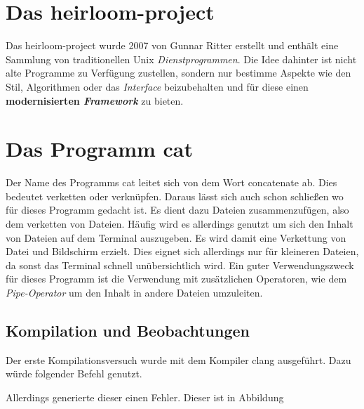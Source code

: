 \section{Das heirloom-project}
Das heirloom-project wurde 2007 von Gunnar Ritter erstellt und enthält eine Sammlung von traditionellen Unix \textit{Dienstprogrammen}. Die Idee dahinter ist nicht alte Programme zu Verfügung zustellen, sondern nur bestimme Aspekte wie den Stil, Algorithmen oder das \textit{Interface} beizubehalten und für diese einen \textbf{modernisierten \textit{Framework}} zu bieten.

\section{Das Programm cat}
Der Name des Programms cat leitet sich von dem Wort concatenate ab. Dies bedeutet verketten oder verknüpfen. Daraus lässt sich auch schon schließen wo für dieses Programm gedacht ist. Es dient dazu Dateien zusammenzufügen, also dem verketten von Dateien. Häufig wird es allerdings genutzt um sich den Inhalt von Dateien auf dem Terminal auszugeben. Es wird damit eine Verkettung von Datei und Bildschirm erzielt. Dies eignet sich allerdings nur für kleineren Dateien, da sonst das Terminal schnell unübersichtlich wird. Ein guter Verwendungszweck für dieses Programm ist die Verwendung mit zusätzlichen Operatoren, wie dem \textit{Pipe-Operator} um den Inhalt in andere Dateien umzuleiten.

\subsection{Kompilation und Beobachtungen}
Der erste Kompilationsversuch wurde mit dem Kompiler clang ausgeführt. Dazu würde folgender Befehl genutzt.

Allerdings generierte dieser einen Fehler. Dieser ist in Abbildung 
